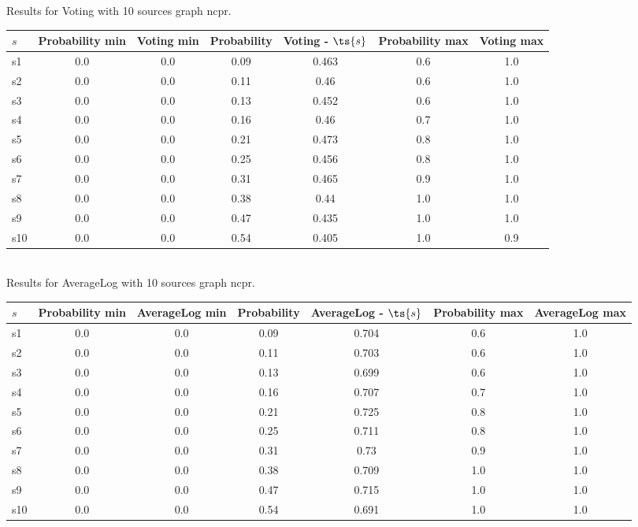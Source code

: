 \documentclass{article}
\begin{document}
\noindent Results for Voting with 10 sources graph ncpr.

\noindent\begin{tabular}{|l|c|c|c|c|c|c|}
\hline
$s$& Probability min & Voting min & Probability & Voting - $\ts{s}$ & Probability max & Voting max\\
\hline
s1 &0.0 & 0.0 & 0.09 & 0.463 & 0.6 & 1.0\\
\hline
s2 &0.0 & 0.0 & 0.11 & 0.46 & 0.6 & 1.0\\
\hline
s3 &0.0 & 0.0 & 0.13 & 0.452 & 0.6 & 1.0\\
\hline
s4 &0.0 & 0.0 & 0.16 & 0.46 & 0.7 & 1.0\\
\hline
s5 &0.0 & 0.0 & 0.21 & 0.473 & 0.8 & 1.0\\
\hline
s6 &0.0 & 0.0 & 0.25 & 0.456 & 0.8 & 1.0\\
\hline
s7 &0.0 & 0.0 & 0.31 & 0.465 & 0.9 & 1.0\\
\hline
s8 &0.0 & 0.0 & 0.38 & 0.44 & 1.0 & 1.0\\
\hline
s9 &0.0 & 0.0 & 0.47 & 0.435 & 1.0 & 1.0\\
\hline
s10 &0.0 & 0.0 & 0.54 & 0.405 & 1.0 & 0.9\\
\hline
\end{tabular}\\

\noindent Results for AverageLog with 10 sources graph ncpr.

\noindent\begin{tabular}{|l|c|c|c|c|c|c|}
\hline
$s$& Probability min & AverageLog min & Probability & AverageLog - $\ts{s}$ & Probability max & AverageLog max\\
\hline
s1 &0.0 & 0.0 & 0.09 & 0.704 & 0.6 & 1.0\\
\hline
s2 &0.0 & 0.0 & 0.11 & 0.703 & 0.6 & 1.0\\
\hline
s3 &0.0 & 0.0 & 0.13 & 0.699 & 0.6 & 1.0\\
\hline
s4 &0.0 & 0.0 & 0.16 & 0.707 & 0.7 & 1.0\\
\hline
s5 &0.0 & 0.0 & 0.21 & 0.725 & 0.8 & 1.0\\
\hline
s6 &0.0 & 0.0 & 0.25 & 0.711 & 0.8 & 1.0\\
\hline
s7 &0.0 & 0.0 & 0.31 & 0.73 & 0.9 & 1.0\\
\hline
s8 &0.0 & 0.0 & 0.38 & 0.709 & 1.0 & 1.0\\
\hline
s9 &0.0 & 0.0 & 0.47 & 0.715 & 1.0 & 1.0\\
\hline
s10 &0.0 & 0.0 & 0.54 & 0.691 & 1.0 & 1.0\\
\hline
\end{tabular}\\
\end{document}

